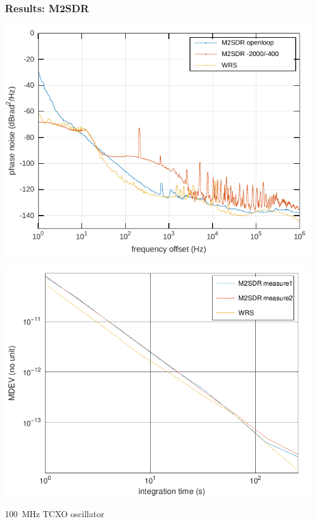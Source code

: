 \documentclass[compress,10pt,aspectratio=169]{beamer}
\begin{document}
\begin{frame}[fragile]\frametitle{Results: M2SDR}

\begin{minipage}[t]{\linewidth}
\begin{minipage}{.49\linewidth}
\includegraphics[width=\linewidth]{m2sdr.pdf}
\end{minipage}
\begin{minipage}{.49\linewidth}
\includegraphics[width=\linewidth]{M2SDR_vs_WRS_allan}
\end{minipage}
\end{minipage}

100~MHz TCXO oscillator
\end{frame}
\end{document}

